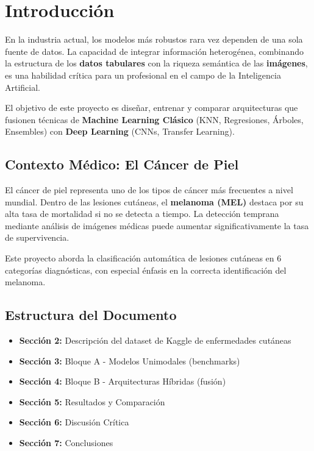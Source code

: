 \documentclass[12pt,a4paper]{article}
\begin{document}
\section{Introducción}

En la industria actual, los modelos más robustos rara vez dependen de una sola fuente de datos. La capacidad de integrar información heterogénea, combinando la estructura de los \textbf{datos tabulares} con la riqueza semántica de las \textbf{imágenes}, es una habilidad crítica para un profesional en el campo de la Inteligencia Artificial.

El objetivo de este proyecto es diseñar, entrenar y comparar arquitecturas que fusionen técnicas de \textbf{Machine Learning Clásico} (KNN, Regresiones, Árboles, Ensembles) con \textbf{Deep Learning} (CNNs, Transfer Learning).

\subsection{Contexto Médico: El Cáncer de Piel}

El cáncer de piel representa uno de los tipos de cáncer más frecuentes a nivel mundial. Dentro de las lesiones cutáneas, el \textbf{melanoma (MEL)} destaca por su alta tasa de mortalidad si no se detecta a tiempo. La detección temprana mediante análisis de imágenes médicas puede aumentar significativamente la tasa de supervivencia.

Este proyecto aborda la clasificación automática de lesiones cutáneas en 6 categorías diagnósticas, con especial énfasis en la correcta identificación del melanoma.

\subsection{Estructura del Documento}

\begin{itemize}
    \item \textbf{Sección 2:} Descripción del dataset de Kaggle de enfermedades cutáneas
    \item \textbf{Sección 3:} Bloque A - Modelos Unimodales (benchmarks)
    \item \textbf{Sección 4:} Bloque B - Arquitecturas Híbridas (fusión)
    \item \textbf{Sección 5:} Resultados y Comparación
    \item \textbf{Sección 6:} Discusión Crítica
    \item \textbf{Sección 7:} Conclusiones
\end{itemize}
\end{document}
